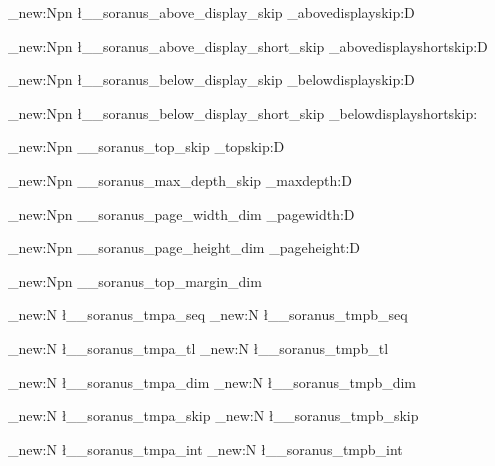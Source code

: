 %
%
%
% 
%




\cs_new:Npn \l__soranus_above_display_skip
  {\tex_abovedisplayskip:D}

\cs_new:Npn \l__soranus_above_display_short_skip
  {\tex_abovedisplayshortskip:D}

\cs_new:Npn \l__soranus_below_display_skip
  {\tex_belowdisplayskip:D}

\cs_new:Npn \l__soranus_below_display_short_skip
  {\tex_belowdisplayshortskip:}

\cs_new:Npn \g__soranus_top_skip
  {\tex_topskip:D}

\cs_new:Npn \g__soranus_max_depth_skip
  {\tex_maxdepth:D}

\cs_new:Npn \g__soranus_page_width_dim
  {\tex_pagewidth:D}

\cs_new:Npn \g__soranus_page_height_dim
  {\tex_pageheight:D}




\cs_new:Npn \g__soranus_top_margin_dim
  {\topmargin}





%

\seq_new:N \l__soranus_tmpa_seq
\seq_new:N \l__soranus_tmpb_seq

\tl_new:N \l__soranus_tmpa_tl
\tl_new:N \l__soranus_tmpb_tl

\dim_new:N \l__soranus_tmpa_dim
\dim_new:N \l__soranus_tmpb_dim

\skip_new:N \l__soranus_tmpa_skip
\skip_new:N \l__soranus_tmpb_skip

\int_new:N \l__soranus_tmpa_int
\int_new:N \l__soranus_tmpb_int
